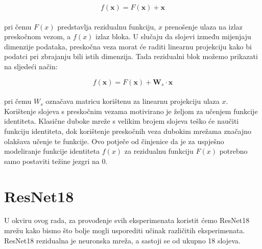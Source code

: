 \documentclass[times, utf8, zavrsni, numeric]{fer}
\begin{document}
\begin{equation}
    f(\pmb{x}) = F(\pmb{x}) + \pmb{x}
    \label{eq:resblock}
\end{equation}
\\
pri čemu $F(x)$ predstavlja rezidualnu funkciju, $x$ prenošenje ulaza na izlaz preskočnom vezom, a $f(x)$ izlaz bloka. 
U slučaju da slojevi između mijenjaju dimenzije podataka, preskočna veza morat će raditi linearnu projekciju kako bi podatci pri zbrajanju bili istih dimenzija. 
Tada rezidualni blok možemo prikazati na sljedeći način:

\begin{equation}
    f(\pmb{x}) = F(\pmb{x}) + \pmb{W}_{s} \cdot \pmb{x}
    \label{eq:resblocklp}
\end{equation}
\\
pri čemu $W_{s}$ označava matricu korištenu za linearnu projekciju ulaza $x$. 
Korištenje slojeva s preskočnim vezama motivirano je željom za učenjem funkcije identiteta.
Klasične duboke mreže s velikim brojem slojeva teško će naučiti funkciju identiteta, dok korištenje preskočnih veza dubokim mrežama značajno olakšava učenje te funkcije.
Ovo potječe od činjenice da je za uspješno modeliranje funkcije identiteta $f(x)$ za rezidualnu funkciju $F(x)$ potrebno samo postaviti težine jezgri na 0.

\section{ResNet18}

U okviru ovog rada, za provođenje svih eksperimenata koristit ćemo ResNet18 mrežu kako bismo što bolje mogli usporediti učinak različitih eksperimenata. 
ResNet18 rezidualna je neuronska mreža, a sastoji se od ukupno 18 slojeva. 
\end{document}
